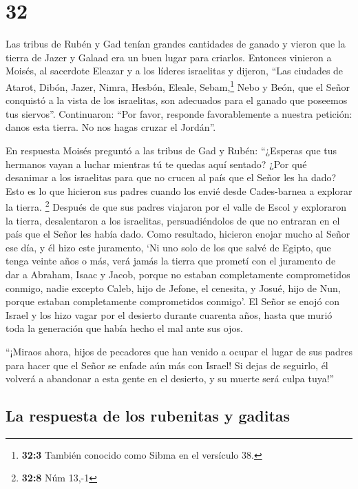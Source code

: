 \hypertarget{section-31}{%
\section{32}\label{section-31}}

 Las tribus de Rubén y Gad tenían grandes cantidades de
ganado y vieron que la tierra de Jazer y Galaad era un buen lugar para
criarlos.  Entonces vinieron a Moisés, al sacerdote
Eleazar y a los líderes israelitas y dijeron,  ``Las
ciudades de Atarot, Dibón, Jazer, Nimra, Hesbón, Eleale,
Sebam,\footnote{\textbf{32:3} También conocido como Sibma en el
  versículo 38.} Nebo y Beón,  que el Señor conquistó a la
vista de los israelitas, son adecuados para el ganado que poseemos tus
siervos''.  Continuaron: ``Por favor, responde
favorablemente a nuestra petición: danos esta tierra. No nos hagas
cruzar el Jordán''.

 En respuesta Moisés preguntó a las tribus de Gad y Rubén:
``¿Esperas que tus hermanos vayan a luchar mientras tú te quedas aquí
sentado?  ¿Por qué desanimar a los israelitas para que no
crucen al país que el Señor les ha dado?  Esto es lo que
hicieron sus padres cuando los envié desde Cades-barnea a explorar la
tierra. \footnote{\textbf{32:8} Núm 13,-1}  Después de que
sus padres viajaron por el valle de Escol y exploraron la tierra,
desalentaron a los israelitas, persuadiéndolos de que no entraran en el
país que el Señor les había dado.  Como resultado,
hicieron enojar mucho al Señor ese día, y él hizo este juramento,
 `Ni uno solo de los que salvé de Egipto, que tenga
veinte años o más, verá jamás la tierra que prometí con el juramento de
dar a Abraham, Isaac y Jacob, porque no estaban completamente
comprometidos conmigo,  nadie excepto Caleb, hijo de
Jefone, el cenesita, y Josué, hijo de Nun, porque estaban completamente
comprometidos conmigo'.  El Señor se enojó con Israel y
los hizo vagar por el desierto durante cuarenta años, hasta que murió
toda la generación que había hecho el mal ante sus ojos.

 ``¡Miraos ahora, hijos de pecadores que han venido a
ocupar el lugar de sus padres para hacer que el Señor se enfade aún más
con Israel!  Si dejas de seguirlo, él volverá a abandonar
a esta gente en el desierto, y su muerte será culpa tuya!''

\hypertarget{la-respuesta-de-los-rubenitas-y-gaditas}{%
\subsection{La respuesta de los rubenitas y
gaditas}\label{la-respuesta-de-los-rubenitas-y-gaditas}}

